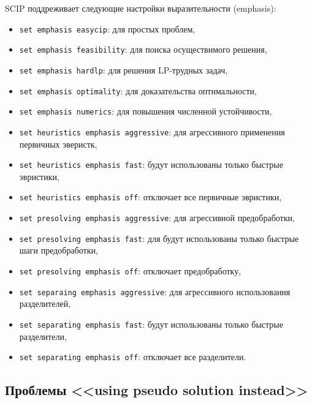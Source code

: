 \documentclass[%
	11pt,
	a4paper,
	utf8,
		]{article}
\begin{document}
SCIP поддреживает следующие настройки выразительности (emphasis):
\begin{itemize}
	\item \texttt{set emphasis easycip}: для простых проблем,
	
	\item \texttt{set emphasis feasibility}: для поиска осуществимого решения,
	
	\item \texttt{set emphasis hardlp}: для решения LP-трудных задач,
	
	\item \texttt{set emphasis optimality}: для доказательства оптимальности,
	
	\item \texttt{set emphasis numerics}: для повышения численной устойчивости,
	
	\item \texttt{set heuristics emphasis aggressive}: для агрессивного применения первичных эверистк,
	
	\item \texttt{set heuristics emphasis fast}: будут использованы только быстрые эвристики,
	
	\item \texttt{set heuristics emphasis off}: отключает все первичные эвристики,
	
	\item \texttt{set presolving emphasis aggressive}: для агрессивной предобработки,
	
	\item \texttt{set presolving emphasis fast}: для будут использованы только быстрые шаги предобработки,
	
	\item \texttt{set presolving emphasis off}: отключает предобработку,
	
	\item \texttt{set separaing emphasis aggressive}: для агрессивного использования разделителей,
	
	\item \texttt{set separating emphasis fast}: будут использованы только быстрые разделители,
	
	\item \texttt{set separating emphasis off}: отключает все разделители.
\end{itemize}

\subsection{Проблемы <<using pseudo solution instead>>}
\end{document}
